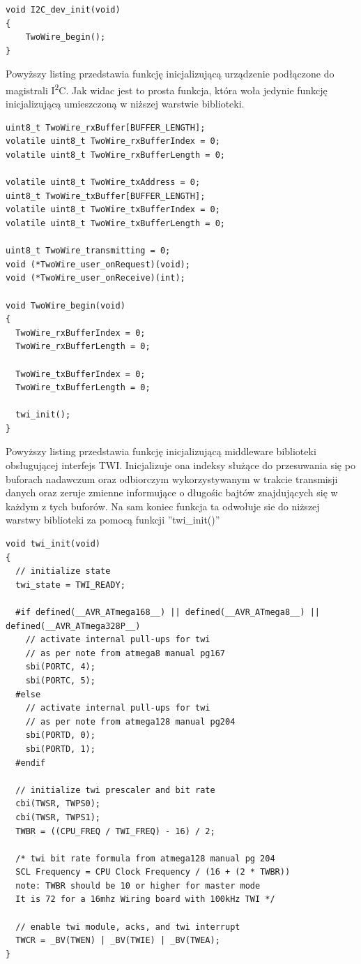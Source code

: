 \begin{lstlisting}
void I2C_dev_init(void)
{
	TwoWire_begin();
}
\end{lstlisting}

Powyższy listing przedstawia funkcję inicjalizującą urządzenie podłączone do magistrali I\textsuperscript{2}C. Jak widac jest to prosta funkcja, która woła jedynie funkcję inicjalizującą umieszczoną w niższej warstwie biblioteki.

\begin{lstlisting}
uint8_t TwoWire_rxBuffer[BUFFER_LENGTH];
volatile uint8_t TwoWire_rxBufferIndex = 0;
volatile uint8_t TwoWire_rxBufferLength = 0;

volatile uint8_t TwoWire_txAddress = 0;
uint8_t TwoWire_txBuffer[BUFFER_LENGTH];
volatile uint8_t TwoWire_txBufferIndex = 0;
volatile uint8_t TwoWire_txBufferLength = 0;

uint8_t TwoWire_transmitting = 0;
void (*TwoWire_user_onRequest)(void);
void (*TwoWire_user_onReceive)(int);

void TwoWire_begin(void)
{
  TwoWire_rxBufferIndex = 0;
  TwoWire_rxBufferLength = 0;

  TwoWire_txBufferIndex = 0;
  TwoWire_txBufferLength = 0;

  twi_init();
}
\end{lstlisting}

Powyższy listing przedstawia funkcję inicjalizującą middleware biblioteki obsługującej interfejs TWI. Inicjalizuje ona indeksy służące do przesuwania się po buforach nadawczum oraz odbiorczym wykorzystywanym w trakcie transmisji danych oraz zeruje zmienne informujące o długośic bajtów znajdujących się w każdym z tych buforów. Na sam koniec funkcja ta odwołuje sie do niższej warstwy biblioteki za pomocą funkcji ''twi\_init()''

\begin{lstlisting}
void twi_init(void)
{
  // initialize state
  twi_state = TWI_READY;

  #if defined(__AVR_ATmega168__) || defined(__AVR_ATmega8__) || defined(__AVR_ATmega328P__)
    // activate internal pull-ups for twi
    // as per note from atmega8 manual pg167
    sbi(PORTC, 4);
    sbi(PORTC, 5);
  #else
    // activate internal pull-ups for twi
    // as per note from atmega128 manual pg204
    sbi(PORTD, 0);
    sbi(PORTD, 1);
  #endif

  // initialize twi prescaler and bit rate
  cbi(TWSR, TWPS0);
  cbi(TWSR, TWPS1);
  TWBR = ((CPU_FREQ / TWI_FREQ) - 16) / 2;

  /* twi bit rate formula from atmega128 manual pg 204
  SCL Frequency = CPU Clock Frequency / (16 + (2 * TWBR))
  note: TWBR should be 10 or higher for master mode
  It is 72 for a 16mhz Wiring board with 100kHz TWI */

  // enable twi module, acks, and twi interrupt
  TWCR = _BV(TWEN) | _BV(TWIE) | _BV(TWEA);
}
\end{lstlisting}

